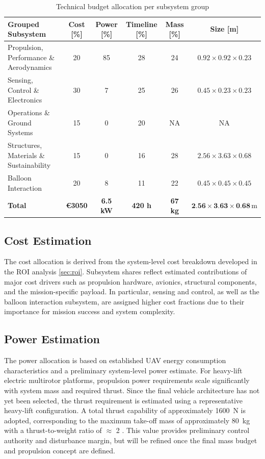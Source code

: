 \begin{table}[H]
\centering
\caption{Technical budget allocation per subsystem group}
\vspace{-8pt}
\label{tab:tech_budget}
\begin{tabular}{lccccc}
\toprule
Grouped Subsystem & Cost [\%] & Power [\%] & Timeline [\%] & Mass [\%] & Size [m] \\
\midrule
Propulsion, Performance \& Aerodynamics & 20 & 85 & 28 & 24 & $0.92 \times 0.92 \times 0.23$ \\
Sensing, Control \& Electronics & 30 & 7 & 25 & 26 & $0.45 \times 0.23 \times 0.23$ \\
Operations \& Ground Systems & 15 & 0 & 20 & NA & NA \\
Structures, Materials \& Sustainability & 15 & 0 & 16 & 28 & $2.56 \times 3.63 \times 0.68$ \\
Balloon Interaction & 20 & 8 & 11 & 22 & $0.45 \times 0.45 \times 0.45$ \\
\midrule
\textbf{Total} & \textbf{€3050} & \textbf{6.5 kW} & \textbf{420 h} & \textbf{67 kg} & \textbf{$\textbf{2.56} \times \textbf{3.63} \times \textbf{0.68}\,\text{m}$} \\
\bottomrule
\end{tabular}
\end{table}
\vspace{-20pt}
\subsection{Cost Estimation}
The cost allocation is derived from the system-level cost breakdown developed in the ROI analysis \autoref{sec:roi}. Subsystem shares reflect estimated contributions of major cost drivers such as propulsion hardware, avionics, structural components, and the mission-specific payload. In particular, sensing and control, as well as the balloon interaction subsystem, are assigned higher cost fractions due to their importance for mission success and system complexity.
\vspace{-10pt}
\subsection{Power Estimation}
The power allocation is based on established UAV energy consumption characteristics and a preliminary system-level power estimate. For heavy-lift electric multirotor platforms, propulsion power requirements scale significantly with system mass and required thrust. Since the final vehicle architecture has not yet been selected, the thrust requirement is estimated using a representative heavy-lift configuration. A total thrust capability of approximately 1600~N is adopted, corresponding to the maximum take-off mass of approximately 80~kg with a thrust-to-weight ratio of $\approx$ 2 \cite{Liu2017ASystems, DJIDJI}. This value provides preliminary control authority and disturbance margin, but will be refined once the final mass budget and propulsion concept are defined.


